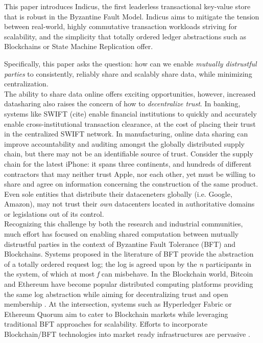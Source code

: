 


This paper introduces Indicus, the first leaderless transactional key-value store that is robust in the Byzantine Fault Model. Indicus aims to mitigate the tension between real-world, highly commutative transaction workloads striving for scalability, and the simplicity that totally ordered ledger abstractions such as Blockchains or State Machine Replication offer.

 Specifically, this paper asks the question: how can we enable \textit{mutually distrustful parties} to consistently, reliably share and scalably share data, while minimizing centralization. \\


The ability to share data online offers exciting opportunities, however, increased datasharing also raises the concern of how to \textit{decentralize trust}. In banking, systems like SWIFT (cite) enable financial institutions to quickly and accurately enable cross-institutional transaction clearance, at the cost of placing their trust in the centralized SWIFT network. In manufacturing, online data sharing can improve accountability and auditing amongst the globally distributed supply chain, but there may not be an identifiable source of trust. Consider the supply chain for the latest iPhone: it spans three continents, and hundreds of different contractors \cite{AppleSup} that may neither trust Apple, nor each other, yet must be willing to share and agree on information concerning the construction of the same product. Even sole entities that distribute their dataceneters globally (i.e. Google, Amazon), may not trust their \textit{own} datacenters located in authoritative domains or legislations out of its control.\\


Recognizing this challenge by both the research and industrial communities, much effort has focused on enabling shared computation between mutually distrustful parties in the context of Byzantine Fault Tolerance (BFT) and Blockchains. 
Systems proposed in the literature of BFT provide the abstraction of a totally ordered request log; the log is agreed upon by the \textit{n} participants in the system, of which at most \textit{f} can misbehave. In the Blockchain world, Bitcoin and Ethereum have become popular distributed computing platforms providing the same log abstraction while aiming for decentralizing trust and open membership . At the intersection, systems such as Hyperledger Fabric \cite{Hyperledger} or Ethereum Quorum \cite{EthereumQuorum} aim to cater to Blockchain markets while leveraging traditional BFT approaches for scalability. Efforts to incorporate Blockchain/BFT technologies into market ready infrastructures are pervasive \cite{StateFarmQuorum, AutoInventory, StateFarmQuorum2, HyperledgerTelecom, HyperledgerHealth}. \\



